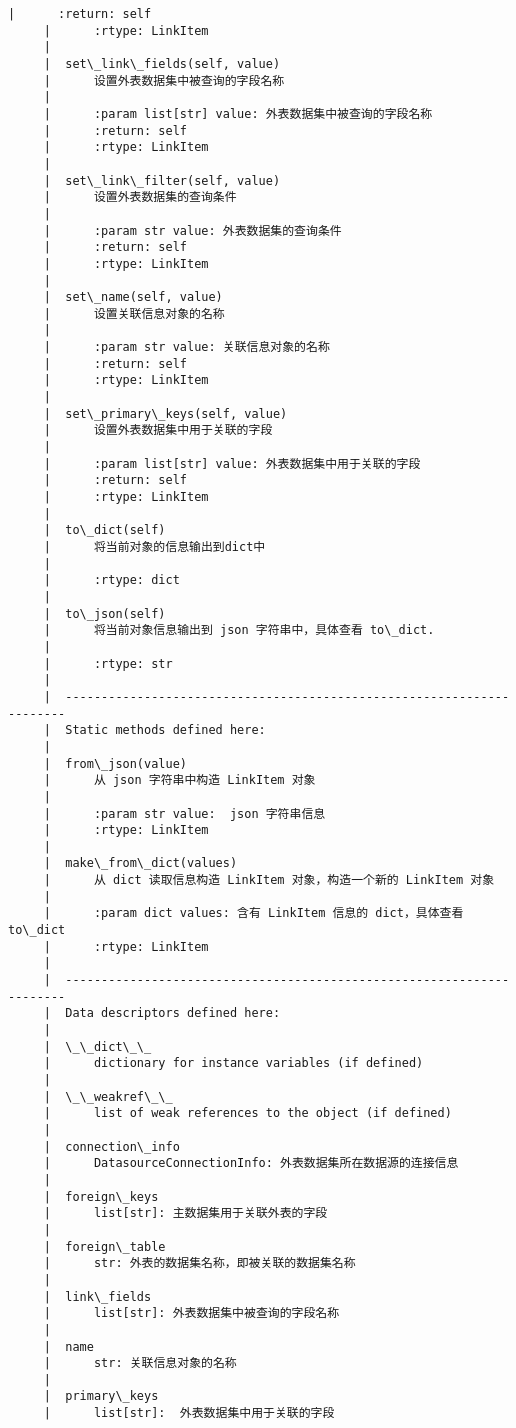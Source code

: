 \documentclass[11pt]{article}
\begin{document}
\begin{Verbatim}[commandchars=\\\{\}]
     |      :return: self
     |      :rtype: LinkItem
     |  
     |  set\_link\_fields(self, value)
     |      设置外表数据集中被查询的字段名称
     |      
     |      :param list[str] value: 外表数据集中被查询的字段名称
     |      :return: self
     |      :rtype: LinkItem
     |  
     |  set\_link\_filter(self, value)
     |      设置外表数据集的查询条件
     |      
     |      :param str value: 外表数据集的查询条件
     |      :return: self
     |      :rtype: LinkItem
     |  
     |  set\_name(self, value)
     |      设置关联信息对象的名称
     |      
     |      :param str value: 关联信息对象的名称
     |      :return: self
     |      :rtype: LinkItem
     |  
     |  set\_primary\_keys(self, value)
     |      设置外表数据集中用于关联的字段
     |      
     |      :param list[str] value: 外表数据集中用于关联的字段
     |      :return: self
     |      :rtype: LinkItem
     |  
     |  to\_dict(self)
     |      将当前对象的信息输出到dict中
     |      
     |      :rtype: dict
     |  
     |  to\_json(self)
     |      将当前对象信息输出到 json 字符串中，具体查看 to\_dict.
     |      
     |      :rtype: str
     |  
     |  ----------------------------------------------------------------------
     |  Static methods defined here:
     |  
     |  from\_json(value)
     |      从 json 字符串中构造 LinkItem 对象
     |      
     |      :param str value:  json 字符串信息
     |      :rtype: LinkItem
     |  
     |  make\_from\_dict(values)
     |      从 dict 读取信息构造 LinkItem 对象，构造一个新的 LinkItem 对象
     |      
     |      :param dict values: 含有 LinkItem 信息的 dict，具体查看 to\_dict
     |      :rtype: LinkItem
     |  
     |  ----------------------------------------------------------------------
     |  Data descriptors defined here:
     |  
     |  \_\_dict\_\_
     |      dictionary for instance variables (if defined)
     |  
     |  \_\_weakref\_\_
     |      list of weak references to the object (if defined)
     |  
     |  connection\_info
     |      DatasourceConnectionInfo: 外表数据集所在数据源的连接信息
     |  
     |  foreign\_keys
     |      list[str]: 主数据集用于关联外表的字段
     |  
     |  foreign\_table
     |      str: 外表的数据集名称，即被关联的数据集名称
     |  
     |  link\_fields
     |      list[str]: 外表数据集中被查询的字段名称
     |  
     |  name
     |      str: 关联信息对象的名称
     |  
     |  primary\_keys
     |      list[str]:  外表数据集中用于关联的字段
    

\end{Verbatim}
\end{document}
